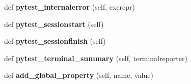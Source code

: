 \begin{DoxyCompactItemize}
\item 
\mbox{\label{class__pytest_1_1junitxml_1_1_log_x_m_l_ae906867d90ce1af191938ef7527a391a}} 
def {\bfseries pytest\+\_\+internalerror} (self, excrepr)
\item 
\mbox{\label{class__pytest_1_1junitxml_1_1_log_x_m_l_af46b72d4557e7458e8767941ad09d293}} 
def {\bfseries pytest\+\_\+sessionstart} (self)
\item 
\mbox{\label{class__pytest_1_1junitxml_1_1_log_x_m_l_a406015d052415964cad5d5d091311912}} 
def {\bfseries pytest\+\_\+sessionfinish} (self)
\item 
\mbox{\label{class__pytest_1_1junitxml_1_1_log_x_m_l_a049c99cd8780597fc795b52827868a6c}} 
def {\bfseries pytest\+\_\+terminal\+\_\+summary} (self, terminalreporter)
\item 
\mbox{\label{class__pytest_1_1junitxml_1_1_log_x_m_l_a624df1aad803ea2b10a95ac52b7017bb}} 
def {\bfseries add\+\_\+global\+\_\+property} (self, name, value)
\end{DoxyCompactItemize}

